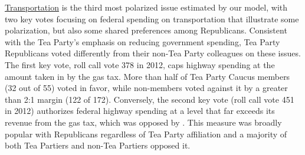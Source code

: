 \underline{Transportation} is the third most polarized issue estimated by our model, with two key votes focusing on federal spending on transportation that illustrate some polarization, but also some shared preferences among Republicans. Consistent with the Tea Party's emphasis on reducing government spending, Tea Party Republicans voted differently from their non-Tea Party colleagues on these issues. The first key vote, roll call vote 378 in 2012, caps highway spending at the amount taken in by the gas tax. More than half of Tea Party Caucus members (32 out of 55) voted in favor, while non-members voted against it by a greater than 2:1 margin (122 of 172). Conversely, the second key vote (roll call vote 451 in 2012) authorizes federal highway spending at a level that far exceeds its revenue from the gas tax, which was opposed by \fw{}.  This measure was broadly popular with Republicans regardless of Tea Party affiliation and a majority of both Tea Partiers and non-Tea Partiers opposed it.































